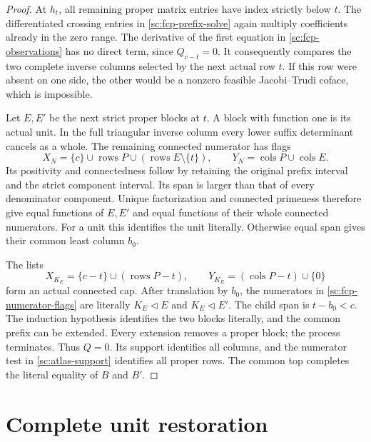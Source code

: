 \documentclass[11pt,a4paper]{amsart}
\numberwithin{equation}{section}
\theoremstyle{plain}
\theoremstyle{definition}
\begin{document}
\begin{proof}
At \(h_t\), all remaining proper matrix entries have index strictly
below \(t\).  The differentiated crossing entries in
\eqref{sc:fcp-prefix-solve} again multiply coefficients already in
the zero range.  The derivative of the first equation in
\eqref{sc:fcp-observations} has no direct term, since \(Q_{c-t}=0\).
It consequently compares the two complete inverse columns selected
by the next actual row \(t\).  If this row were absent on one side,
the other would be a nonzero feasible Jacobi--Trudi coface, which is
impossible.

Let \(E,E'\) be the next strict proper blocks at \(t\).  A block with
function one is its actual unit.  In the full triangular inverse
column every lower suffix determinant cancels as a whole.  The
remaining connected numerator has flags
\begin{equation}\label{sc:fcp-numerator-flags}
 X_N=\{c\}\cup\operatorname{rows}P
             \cup(\operatorname{rows}E\setminus\{t\}),
 \qquad Y_N=\operatorname{cols}P\cup\operatorname{cols}E.
\end{equation}
Its positivity and connectedness follow by retaining the original
prefix interval and the strict component interval.  Its span is
larger than that of every denominator component.  Unique
factorization and connected primeness therefore give equal functions
of \(E,E'\) and equal functions of their whole connected numerators.
For a unit this identifies the unit literally.  Otherwise equal
span gives their common least column \(b_0\).

The lists
\begin{equation}\label{sc:fcp-recursive-cap}
 X_{K_E}=\{c-t\}\cup(\operatorname{rows}P-t),
 \qquad Y_{K_E}=(\operatorname{cols}P-t)\cup\{0\}
\end{equation}
form an actual connected cap.  After translation by \(b_0\), the
numerators in \eqref{sc:fcp-numerator-flags} are literally
\(K_E\triangleleft E\) and \(K_E\triangleleft E'\).
The child span is \(t-b_0<c\).  The induction hypothesis identifies
the two blocks literally, and the common prefix can be extended.
Every extension removes a proper block; the process terminates.
Thus \(Q=0\).  Its support identifies all columns, and the numerator
test in \eqref{sc:atlas-support} identifies all proper rows.  The
common top completes the literal equality of \(B\) and \(B'\).
\end{proof}

\section{Complete unit restoration}\label{sec:unit-restoration}
\end{document}
